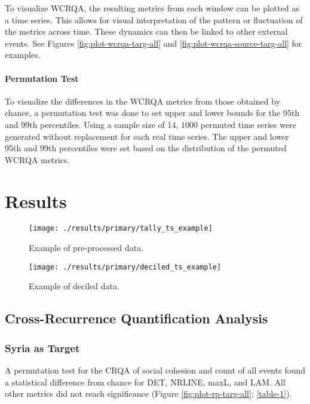 \documentclass[english,man]{apa6}
\begin{document}
To visualize WCRQA, the resulting metrics from each window can be plotted
as a time series. This allows for visual interpretation of the pattern or
fluctuation of the metrics across time. These dynamics can then be linked
to other external events. See Figures \ref{fig:plot-wcrqa-targ-all} and
\ref{fig:plot-wcrqa-source-targ-all} for examples.

\hypertarget{permutation-test-1}{%
\paragraph{Permutation Test}\label{permutation-test-1}}

To visualize the differences in the WCRQA metrics from those obtained by
chance, a permutation test was done to set upper and lower bounds for the
95th and 99th percentiles. Using a sample size of 14, \(1000\) permuted
time series were generated without replacement for each real time series. The
upper and lower 95th and 99th percentiles were set based on the distribution
of the permuted WCRQA metrics.

\hypertarget{results}{%
\section{Results}\label{results}}

\begin{figure}
\texttt{[image: ./results/primary/tally\_ts\_example]} \caption{Example of pre-processed data.}\label{fig:raw-ts}
\end{figure}

\begin{figure}
\texttt{[image: ./results/primary/deciled\_ts\_example]} \caption{Example of deciled data.}\label{fig:deciled-ts}
\end{figure}

\hypertarget{cross-recurrence-quantification-analysis-1}{%
\subsection{Cross-Recurrence Quantification Analysis}\label{cross-recurrence-quantification-analysis-1}}

\hypertarget{syria-as-target}{%
\subsubsection{Syria as Target}\label{syria-as-target}}

A permutation test for the CRQA of social cohesion and count of all events
found a statistical difference from chance for DET, NRLINE, maxL, and LAM.
All other metrics did not reach significance (Figure \ref{fig:plot-rp-targ-all};
\autoref{table-1}).
\end{document}
